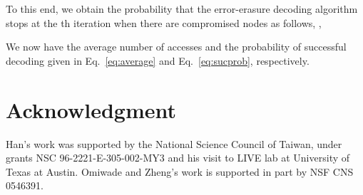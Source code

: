 \documentclass[10pt,journal,letterpaper,compsoc]{IEEEtran}
\newcommand{\0}{{\bf 0}}
\begin{document}
To this end, we obtain the probability that the error-erasure decoding
algorithm stops at the th iteration when there are  compromised nodes as
follows, ,


We now have the average number of accesses and the probability of
successful decoding given in Eq.~\eqref{eq:average} and
Eq.~\eqref{eq:sucprob}, respectively.
\section*{Acknowledgment}
Han's work was supported  by 
the National Science Council of Taiwan, under grants NSC
96-2221-E-305-002-MY3 and his
visit to LIVE lab at University of Texas at Austin. Omiwade and Zheng's work is supported in part by NSF CNS 0546391.


\end{document}
